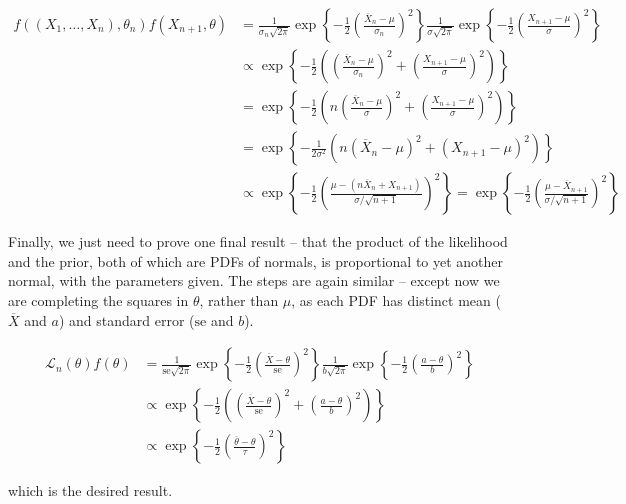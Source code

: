 \begin{align*} 
f((X_{1}, \dots, X_{n}), \theta_{n}) f(X_{n+1}, \theta) &= 
\frac{1}{\sigma_{n} \sqrt{2 \pi}} \exp \left\{-\frac{1}{2} \left(\frac{\overline{X}_{n} - \mu}{\sigma_{n}} \right)^{2} \right\}
\frac{1}{\sigma \sqrt{2 \pi}} \exp \left\{-\frac{1}{2} \left(\frac{X_{n+1} - \mu}{\sigma} \right)^{2} \right\} \\
&\propto \exp \left\{-\frac{1}{2} \left( \left(\frac{\overline{X}_{n} - \mu}{\sigma_{n}} \right)^{2} + \left(\frac{X_{n+1} - \mu}{\sigma} \right)^{2} \right) \right\} \\
&= \exp \left\{-\frac{1}{2} \left( n \left(\frac{\overline{X}_{n} - \mu}{\sigma} \right)^{2} + \left(\frac{X_{n+1} - \mu}{\sigma} \right)^{2} \right) \right\} \\
&= \exp \left\{-\frac{1}{2 \sigma^{2}} \left( n \left(\overline{X}_{n} - \mu\right)^{2} + \left(X_{n+1} - \mu \right)^{2} \right) \right\} \\
&\propto \exp \left\{-\frac{1}{2} \left( \frac{\mu - (n\overline{X}_{n} + X_{n+1})}{\sigma / \sqrt{n+1}} \right)^{2} \right\}
= \exp \left\{-\frac{1}{2}
\left(\frac{\mu - \overline{X}_{n+1}}{\sigma / \sqrt{n+1}}\right)^{2}
\right\}
\end{align*}

Finally, we just need to prove one final result -- that the product of
the likelihood and the prior, both of which are PDFs of normals, is
proportional to yet another normal, with the parameters given. The steps
are again similar -- except now we are completing the squares in
\(\theta\), rather than \(\mu\), as each PDF has distinct mean
(\(\overline{X}\) and \(a\)) and standard error (\(\text{se}\) and
\(b\)).

\begin{align*}
\mathcal{L}_{n}(\theta) f(\theta) 
&= \frac{1}{\text{se} \sqrt{2 \pi}} \exp \left\{-\frac{1}{2} \left(\frac{\overline{X} - \theta}{\text{se}}\right)^{2} \right\} \frac{1}{b \sqrt{2 \pi}} \exp \left\{-\frac{1}{2} \left( \frac{a - \theta}{b} \right)^{2} \right\} \\
& \propto \exp \left\{-\frac{1}{2} \left( \left(\frac{\overline{X} - \theta}{\text{se}}\right)^{2} + \left( \frac{a - \theta}{b} \right)^{2} \right) \right\} \\
& \propto \exp \left\{-\frac{1}{2} \left( \frac{\overline{\theta} - \theta}{\tau} \right)^{2} \right\}
\end{align*}

which is the desired result.


